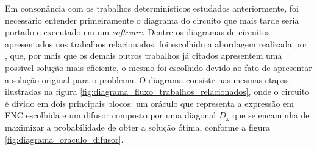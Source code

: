 \documentclass[12pt]{article}
\begin{document}
Em consonância com os trabalhos determinísticos estudados anteriormente, foi necessário entender primeiramente o diagrama do circuito que mais tarde seria portado e executado em um \textit{software}. Dentre os diagramas de circuitos apresentados nos trabalhos relacionados, foi escolhido a abordagem realizada por \cite{fernandes:19}, que, por mais que os demais outros trabalhos já citados apresentem uma possível solução mais eficiente, o mesmo foi escolhido devido ao fato de apresentar a solução original para o problema. O diagrama consiste nas mesmas etapas ilustradas na figura \ref{fig:diagrama_fluxo_trabalhos_relacionados}, onde o circuito é divido em dois principais blocos: um oráculo que representa a expressão em FNC escolhida e um difusor composto por uma diagonal $\mathrm{\textit{D}_x}$ que se encaminha de maximizar a probabilidade de obter a solução ótima, conforme a figura \ref{fig:diagrama_oraculo_difusor}.
\end{document}
